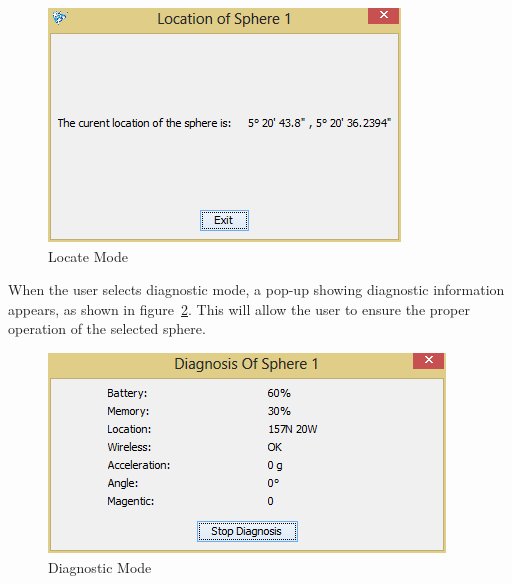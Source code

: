 \begin{figure}[H]
	\centering
	\includegraphics[scale=0.7]{img/locateMode}
	\caption{Locate Mode \label{fig:locateMode}}
\end{figure}

When the user selects diagnostic mode, a pop-up showing diagnostic information appears, as shown in figure~\ref{fig:diagnosticMode}.  This will allow the user to ensure the proper operation of the selected sphere.

\begin{figure}[H]
	\centering
	\includegraphics[scale=0.7]{img/diagnosticMode}
	\caption{Diagnostic Mode \label{fig:diagnosticMode}}
\end{figure}
